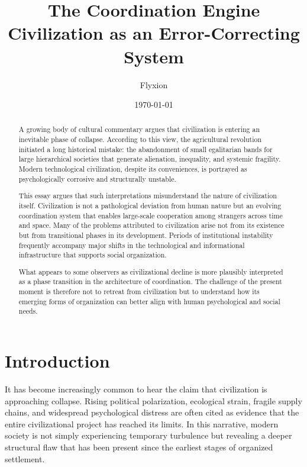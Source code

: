 \documentclass[12pt]{article}
\title{
The Coordination Engine\\
\large Civilization as an Error-Correcting System
}
\author{Flyxion}
\date{\today}
\begin{document}
\maketitle

\begin{abstract}

A growing body of cultural commentary argues that civilization is entering an inevitable phase of collapse. According to this view, the agricultural revolution initiated a long historical mistake: the abandonment of small egalitarian bands for large hierarchical societies that generate alienation, inequality, and systemic fragility. Modern technological civilization, despite its conveniences, is portrayed as psychologically corrosive and structurally unstable.

This essay argues that such interpretations misunderstand the nature of civilization itself. Civilization is not a pathological deviation from human nature but an evolving coordination system that enables large-scale cooperation among strangers across time and space. Many of the problems attributed to civilization arise not from its existence but from transitional phases in its development. Periods of institutional instability frequently accompany major shifts in the technological and informational infrastructure that supports social organization.

What appears to some observers as civilizational decline is more plausibly interpreted as a phase transition in the architecture of coordination. The challenge of the present moment is therefore not to retreat from civilization but to understand how its emerging forms of organization can better align with human psychological and social needs.

\end{abstract}

\newpage
\section{Introduction}

It has become increasingly common to hear the claim that civilization is approaching collapse. Rising political polarization, ecological strain, fragile supply chains, and widespread psychological distress are often cited as evidence that the entire civilizational project has reached its limits. In this narrative, modern society is not simply experiencing temporary turbulence but revealing a deeper structural flaw that has been present since the earliest stages of organized settlement.
\end{document}
